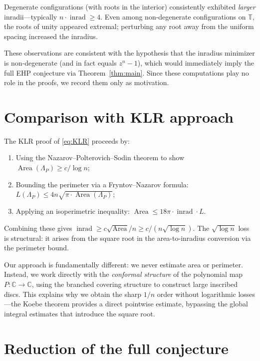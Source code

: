 \documentclass[11pt,a4paper]{amsart}
\theoremstyle{definition}
\newcommand{\T}{\mathbb{T}}
\newcommand{\C}{\mathbb{C}}
\newcommand{\inrad}{\operatorname{inrad}}
\begin{document}
Degenerate configurations (with roots in the interior) consistently
exhibited \emph{larger} inradii---typically $n \cdot \inrad \geq 4$.
Even among non-degenerate configurations on $\T$, the roots of unity
appeared extremal; perturbing any root away from the uniform spacing
increased the inradius.

These observations are consistent with the hypothesis that the inradius
minimizer is non-degenerate (and in fact equals $z^n - 1$), which would
immediately imply the full EHP conjecture via Theorem~\ref{thm:main}.
Since these computations play no role in the proofs, we record
them only as motivation.

\section{Comparison with KLR approach}

The KLR proof of \eqref{eq:KLR} proceeds by:
\begin{enumerate}[(1)]
  \item Using the Nazarov--Polterovich--Sodin theorem to show
    $\operatorname{Area}(\Lambda_P) \geq c/\log n$;
  \item Bounding the perimeter via a Fryntov--Nazarov formula:
    $L(\Lambda_P) \leq 4n\sqrt{\pi \cdot \operatorname{Area}(\Lambda_P)}$;
  \item Applying an isoperimetric inequality:
    $\operatorname{Area} \leq 18\pi \cdot \inrad \cdot L$.
\end{enumerate}
Combining these gives $\inrad \geq c\sqrt{\operatorname{Area}}/n \geq c/(n\sqrt{\log n})$.
The $\sqrt{\log n}$ loss is structural: it arises from the square root
in the area-to-inradius conversion via the perimeter bound.

Our approach is fundamentally different: we never estimate area or
perimeter.  Instead, we work directly with the \emph{conformal structure}
of the polynomial map $P \colon \C \to \C$, using the branched covering
structure to construct large inscribed discs.  This explains why we obtain
the sharp $1/n$ order without logarithmic losses---the Koebe theorem
provides a direct pointwise estimate, bypassing the global integral
estimates that introduce the square root.

\section{Reduction of the full conjecture}
\end{document}
